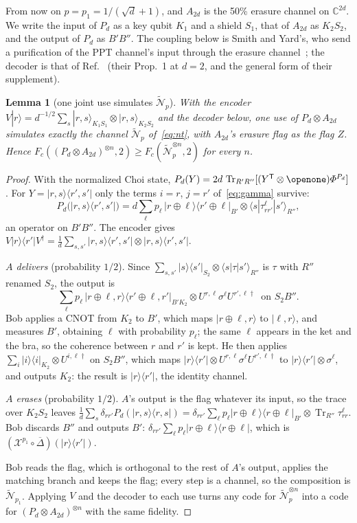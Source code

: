 \documentclass[aps,pra,twocolumn,superscriptaddress,nofootinbib,longbibliography,floatfix]{revtex4-2}
\newtheorem{lemma}[theorem]{Lemma}
\newcommand{\ket}[1]{|#1\rangle}
\newcommand{\bra}[1]{\langle #1|}
\newcommand{\proj}[1]{|#1\rangle\langle #1|}
\newcommand{\tr}{\operatorname{Tr}}
\newcommand{\nt}{\widetilde{\mathcal N}}
\newcommand{\deph}{\overline{\varDelta}}
\newcommand{\mes}{\varPhi}
\begin{document}
From now on $p=p_1=1/(\sqrt d+1)$, and $A_{2d}$ is the 50\% erasure channel on $\mathbb C^{2d}$. We write the input of $P_d$ as a key qubit $K_1$ and a shield $S_1$, that of $A_{2d}$ as $K_2S_2$, and the output of $P_d$ as $B'B''$. The coupling below is Smith and Yard's, who send a purification of the PPT channel's input through the erasure channel~\cite{smith2008quantum}; the decoder is that of Ref.~\cite{parentin2026onset} (their Prop.~1 at $d=2$, and the general form of their supplement).

\begin{lemma}[one joint use simulates $\nt_p$]
\label{lem:reduction}
With the encoder $V\ket r=d^{-1/2}\sum_s\ket{r,s}_{K_1S_1}\otimes\ket{r,s}_{K_2S_2}$ and the decoder below, one use of $P_d\otimes A_{2d}$ simulates exactly the channel $\nt_p$ of~\eqref{eq:nt}, with $A_{2d}$'s erasure flag as the flag $Z$. Hence $F_c((P_d\otimes A_{2d})^{\otimes n},2)\ge F_c(\nt_p^{\otimes n},2)$ for every $n$.
\end{lemma}
\begin{proof}
With the normalized Choi state, $P_d(Y)=2d\,\tr_{R'R''}[(Y^{\mathsf T}\otimes\openone)\mes^{P_d}]$. For $Y=\ket{r,s}\!\bra{r',s'}$ only the terms $i=r$, $j=r'$ of~\eqref{eq:gamma} survive:
\[
P_d\bigl(\ket{r,s}\!\bra{r',s'}\bigr)=d\sum_\ell p_\ell\,\ket{r\oplus\ell}\!\bra{r'\oplus\ell}_{B'}\otimes\bra s\tau^\ell_{rr'}\ket{s'}_{R''},
\]
an operator on $B'B''$. The encoder gives $V\ket r\!\bra{r'}V^\dagger=\frac1d\sum_{s,s'}\ket{r,s}\!\bra{r',s'}\otimes\ket{r,s}\!\bra{r',s'}$.

\emph{$A$ delivers} (probability $1/2$). Since $\sum_{s,s'}\ket s\!\bra{s'}_{S_2}\otimes\bra s\tau\ket{s'}_{R''}$ is $\tau$ with $R''$ renamed $S_2$, the output is
\[
\sum_\ell p_\ell\,\ket{r\oplus\ell,r}\!\bra{r'\oplus\ell,r'}_{B'K_2}\otimes U^{r,\ell}\sigma^\ell U^{r',\ell\dagger}\ \text{ on }S_2B''.
\]
Bob applies a CNOT from $K_2$ to $B'$, which maps $\ket{r\oplus\ell,r}$ to $\ket{\ell,r}$, and measures $B'$, obtaining $\ell$ with probability $p_\ell$; the same $\ell$ appears in the ket and the bra, so the coherence between $r$ and $r'$ is kept. He then applies $\sum_i\proj i_{K_2}\otimes U^{i,\ell\dagger}$ on $S_2B''$, which maps $\ket r\!\bra{r'}\otimes U^{r,\ell}\sigma^\ell U^{r',\ell\dagger}$ to $\ket r\!\bra{r'}\otimes\sigma^\ell$, and outputs $K_2$: the result is $\ket r\!\bra{r'}$, the identity channel.

\emph{$A$ erases} (probability $1/2$). $A$'s output is the flag whatever its input, so the trace over $K_2S_2$ leaves $\frac1d\sum_s\delta_{rr'}P_d(\ket{r,s}\!\bra{r,s})=\delta_{rr'}\sum_\ell p_\ell\proj{r\oplus\ell}_{B'}\otimes\tr_{R''}\tau^\ell_{rr}$. Bob discards $B''$ and outputs $B'$: $\delta_{rr'}\sum_\ell p_\ell\proj{r\oplus\ell}$, which is $(\mathcal X^{p_1}\circ\deph)(\ket r\!\bra{r'})$.

Bob reads the flag, which is orthogonal to the rest of $A$'s output, applies the matching branch and keeps the flag; every step is a channel, so the composition is $\nt_{p_1}$. Applying $V$ and the decoder to each use turns any code for $\nt_p^{\otimes n}$ into a code for $(P_d\otimes A_{2d})^{\otimes n}$ with the same fidelity.
\end{proof}
\end{document}
